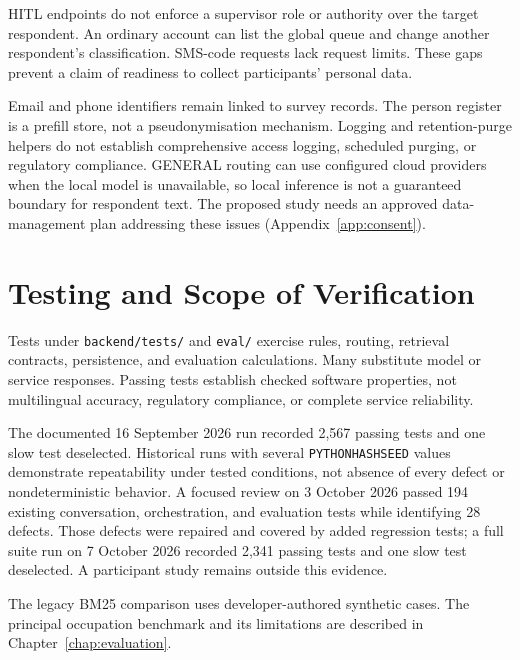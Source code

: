 HITL endpoints do not enforce a supervisor role or authority over the
target respondent. An ordinary account can list the global queue and
change another respondent's classification. SMS-code requests lack request
limits. These gaps prevent a claim of readiness to collect participants'
personal data.

Email and phone identifiers remain linked to survey records. The person
register is a prefill store, not a pseudonymisation mechanism. Logging and
retention-purge helpers do not establish comprehensive access logging,
scheduled purging, or regulatory compliance. GENERAL routing can use
configured cloud providers when the local model is unavailable, so local
inference is not a guaranteed boundary for respondent text. The proposed
study needs an approved data-management plan addressing these issues
(Appendix~\ref{app:consent}).

\section{Testing and Scope of Verification}
\label{sec:impl-testing}

Tests under \texttt{backend/tests/} and \texttt{eval/} exercise rules,
routing, retrieval contracts, persistence, and evaluation calculations.
Many substitute model or service responses. Passing tests establish
checked software properties, not multilingual accuracy, regulatory
compliance, or complete service reliability.

The documented 16 September 2026 run recorded 2,567 passing tests and one
slow test deselected. Historical runs with several
\texttt{PYTHONHASHSEED} values demonstrate repeatability under tested
conditions, not absence of every defect or nondeterministic behavior.
A focused review on 3 October 2026 passed 194 existing conversation,
orchestration, and evaluation tests while identifying 28 defects. Those
defects were repaired and covered by added regression tests; a full suite
run on 7 October 2026 recorded 2,341 passing tests and one slow test
deselected. A participant study remains outside this evidence.

The legacy BM25 comparison uses developer-authored synthetic cases.
The principal occupation benchmark and its limitations are described in
Chapter~\ref{chap:evaluation}.
